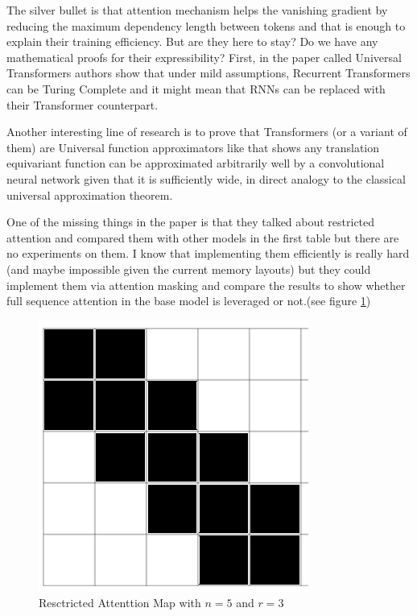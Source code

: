 \documentclass{article}
\begin{document}
The silver bullet is that attention mechanism helps the vanishing gradient by reducing the maximum dependency length between tokens and that is enough to explain their training efficiency. But are they here to stay? Do we have any mathematical proofs for their expressibility? First, in the paper called Universal Transformers\citep{1807.03819} authors show that under mild assumptions, Recurrent Transformers can be Turing Complete and it might mean that RNNs can be replaced with their Transformer counterpart.

Another interesting line of research is to prove that Transformers (or a variant of them) are Universal function approximators like \citep{1804.10306} that shows any translation equivariant function can be approximated arbitrarily well by a convolutional neural network given that it is sufficiently wide, in direct analogy to the classical universal approximation theorem.

One of the missing things in the paper is that they talked about restricted attention and compared them with other models in the first table but there are no experiments on them. I know that implementing them efficiently is really hard (and maybe impossible given the current memory layouts) but they could implement them via attention masking and compare the results to show whether full sequence attention in the base model is leveraged or not.(see figure \ref{fig:rattention})

\begin{figure}[H]
  \centering
  \includegraphics[scale=0.20]{restricted.png}
  \caption{Resctricted Attenttion Map with $n=5$ and $r=3$}
  \label{fig:rattention}
\end{figure}
\end{document}
